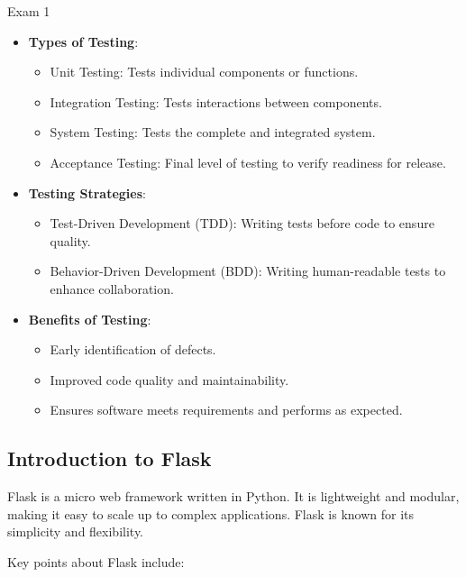 \begin{examnotes}{Exam 1}
\begin{highlight}
        \begin{itemize}
            \item \textbf{Types of Testing}:
                \begin{itemize}
                    \item Unit Testing: Tests individual components or functions.
                    \item Integration Testing: Tests interactions between components.
                    \item System Testing: Tests the complete and integrated system.
                    \item Acceptance Testing: Final level of testing to verify readiness for release.
                \end{itemize}
            \item \textbf{Testing Strategies}:
                \begin{itemize}
                    \item Test-Driven Development (TDD): Writing tests before code to ensure quality.
                    \item Behavior-Driven Development (BDD): Writing human-readable tests to enhance collaboration.
                \end{itemize}
            \item \textbf{Benefits of Testing}:
                \begin{itemize}
                    \item Early identification of defects.
                    \item Improved code quality and maintainability.
                    \item Ensures software meets requirements and performs as expected.
                \end{itemize}
        \end{itemize}
    \end{highlight}
    
    \subsection*{Introduction to Flask}
    
    Flask is a micro web framework written in Python. It is lightweight and modular, making it easy to scale up to complex applications. Flask is known for its simplicity and flexibility.
    
    \begin{highlight}
        Key points about Flask include:
        

\end{highlight}
\end{examnotes}
